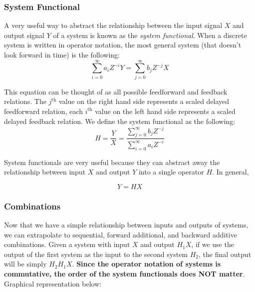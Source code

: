 \documentclass[a4paper]{article}
\numberwithin{equation}{section}
\begin{document}
\subsubsection{System Functional}

A very useful way to abstract the relationship between the input signal $X$ and output signal $Y$ of a system is known as the \textit{system functional}. When a discrete system is written in operator notation, the most general system (that doesn't look forward in time) is the following:
\begin{equation}
\sum_{i=0}^{\infty} a_i Z^{-i}Y=\sum_{j=0}^{\infty} b_j Z^{-j}X
\end{equation}

This equation can be thought of as all possible feedforward and feedback relations. The  $j^{\text{th}}$ value on the right hand side represents a scaled delayed feedforward relation, each $i^{\text{th}}$ value on the left hand side represents a scaled delayed feedback relation. We define the system functional as the following:
\begin{equation}
\boxed{H=\frac{Y}{X}=\frac{\sum_{j=0}^{\infty} b_j Z^{-j}}{\sum_{i=0}^{\infty} a_i Z^{-i}}}
\end{equation}

System functionals are very useful because they can abstract away the relationship between input $X$ and output $Y$ into a single operator $H$. In general,

\begin{center}
\end{center}

\begin{equation}
Y=HX
\end{equation}

\subsubsection{Combinations}

Now that we have a simple relationship between inputs and outputs of systems, we can extrapolate to sequential, forward additional, and backward additive combinations. Given a system with input $X$ and output $H_{1}X$, if we use the output of the first system as the input to the second system $H_2$, the final output will be simply $H_2H_1X$. \textbf{Since the operator notation of systems is commutative, the order of the system functionals does NOT matter}. Graphical representation below:
\end{document}
